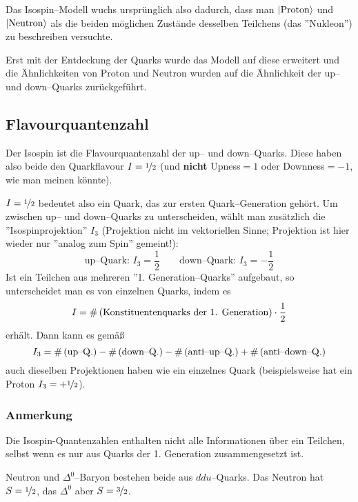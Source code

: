 \documentclass[Ex4_Zusammenfassung.tex]{subfiles}
\begin{document}
Das Isospin--Modell wuchs ursprünglich also dadurch, dass man $\ket{\text{Proton}}$ und $\ket{\text{Neutron}}$ als die beiden möglichen Zustände desselben Teilchens (das ''Nukleon'') zu beschreiben versuchte.

Erst mit der Entdeckung der Quarks wurde das Modell auf diese erweitert und die Ähnlichkeiten von Proton und Neutron wurden auf die Ähnlichkeit der up-- und down--Quarks zurückgeführt.
\subsection{Flavourquantenzahl}
Der Isospin ist die Flavourquantenzahl der up-- und down--Quarks. Diese haben also beide den Quarkflavour $I=\nicefrac{1}{2}$ (und \textbf{nicht} Upness$=1$ oder Downness$=-1$, wie man meinen könnte).

$I = \nicefrac{1}{2}$ bedeutet also ein Quark, das zur ersten Quark--Generation gehört. Um zwischen up-- und down--Quarks zu unterscheiden, wählt man zusätzlich die ''Isospinprojektion'' $I_3$ (Projektion nicht im vektoriellen Sinne; Projektion ist hier wieder nur ''analog zum Spin'' gemeint!):
\begin{equation*}
	\text{up--Quark: } I_3=\frac{1}{2}\qquad \text{down--Quark: } I_3=-\frac{1}{2}
\end{equation*}
Ist ein Teilchen aus mehreren ''1. Generation--Quarks'' aufgebaut, so unterscheidet man es von einzelnen Quarks, indem es
\begin{equation}
	I = \#\left( \text{Konstituentenquarks der 1. Generation} \right) \cdot \frac{1}{2}
\end{equation}
erhält. Dann kann es gemäß
\begin{equation}
	I_3 = \#\left( \text{up--Q.} \right) - \# \left( \text{down--Q.} \right) - \# \left( \text{anti--up--Q.} \right) + \# \left( \text{anti--down--Q.} \right)
\end{equation}
auch dieselben Projektionen haben wie ein einzelnes Quark (beispielsweise hat ein Proton $I_3=+\nicefrac{1}{2}$).
\subsubsection*{Anmerkung}
Die Isospin-Quantenzahlen enthalten nicht alle Informationen über ein Teilchen, selbst wenn es nur aus Quarks der 1. Generation zusammengesetzt ist.
\begin{tcolorbox}[title= Beispiel ,colback=yellow!50!white]
	Neutron und $\Delta^0$--Baryon bestehen beide aus $ddu$--Quarks. Das Neutron hat $S=\nicefrac{1}{2}$, das $\Delta^0$ aber $S=\nicefrac{3}{2}$.
\end{tcolorbox}
\end{document}
